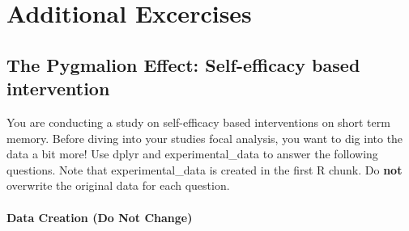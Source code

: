 \documentclass[]{book}
\theoremstyle{definition}
\theoremstyle{definition}
\theoremstyle{definition}
\theoremstyle{remark}
\begin{document}
\hypertarget{part-additional-excercises}{%
\part{Additional Excercises}\label{part-additional-excercises}}

\hypertarget{the-pygmalion-effect-self-efficacy-based-intervention}{%
\chapter{The Pygmalion Effect: Self-efficacy based intervention}\label{the-pygmalion-effect-self-efficacy-based-intervention}}

You are conducting a study on self-efficacy based interventions on short term memory. Before diving into your studies focal analysis, you want to dig into the data a bit more! Use dplyr and experimental\_data to answer the following questions. Note that experimental\_data is created in the first R chunk. Do \textbf{not} overwrite the original data for each question.

\hypertarget{data-creation-do-not-change}{%
\subsection{Data Creation (Do Not Change)}\label{data-creation-do-not-change}}
\end{document}
